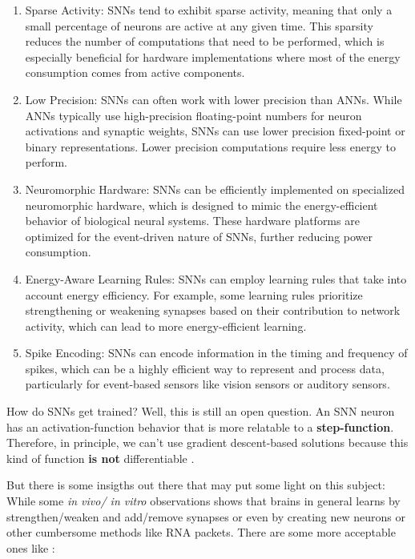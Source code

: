 \begin{frame}[allowframebreaks]
\begin{enumerate}
		\item Sparse Activity: SNNs tend to exhibit sparse activity, meaning that only a small percentage of neurons are active at any given time. This sparsity reduces the number of computations that need to be performed, which is especially beneficial for hardware implementations where most of the energy consumption comes from active components.
		
		\item Low Precision: SNNs can often work with lower precision than ANNs. While ANNs typically use high-precision floating-point numbers for neuron activations and synaptic weights, SNNs can use lower precision fixed-point or binary representations. Lower precision computations require less energy to perform.
		
		\item Neuromorphic Hardware: SNNs can be efficiently implemented on specialized neuromorphic hardware, which is designed to mimic the energy-efficient behavior of biological neural systems. These hardware platforms are optimized for the event-driven nature of SNNs, further reducing power consumption.
		
		\item Energy-Aware Learning Rules: SNNs can employ learning rules that take into account energy efficiency. For example, some learning rules prioritize strengthening or weakening synapses based on their contribution to network activity, which can lead to more energy-efficient learning.
		
		\item Spike Encoding: SNNs can encode information in the timing and frequency of spikes, which can be a highly efficient way to represent and process data, particularly for event-based sensors like vision sensors or auditory sensors.
	\end{enumerate}


	\par How do SNNs get trained? Well, this is still an open question. An SNN neuron has an activation-function behavior that is more relatable to a \textbf{step-function}. Therefore, in principle, we can't use gradient descent-based solutions because this kind of function \textbf{is not} differentiable \cite{kasabov2019time}.
	
	
	\par But there is some insigths out there that may put some light on this subject: While some \textit{in vivo/ in vitro} observations shows that brains in general learns by strengthen/weaken and add/remove synapses or even by creating new neurons or other cumbersome methods like RNA packets. There are some more acceptable ones like \cite{kasabov2019time}:
	

\end{frame}
